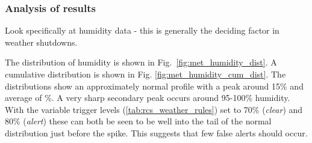 \subsubsection{Analysis of results}
Look specifically at humidity data - this is generally the deciding factor in weather shutdowns.

The distribution of humidity is shown in Fig.~\ref{fig:met_humidity_dist}.  A cumulative distribution is shown in Fig. \ref{fig:met_humidity_cum_dist}. The distributions show an approximately normal profile with a peak around 15\% and average of \%. A very sharp secondary peak occurs around 95-100\% humidity. With the variable trigger levels (\ref{tab:rcs_weather_rules}) set to 70\% (\emph{clear}) and 80\% (\emph{alert}) these can both be seen to be well into the tail of the normal distribution just before the spike. This suggests that few false alerts should occur.

